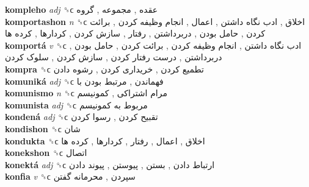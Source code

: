\textbf{kompleho} \emph{adj}  ␝ϲ   عقده ,  مجموعه ,  گروه   \\
\textbf{komportashon} \emph{n}  ␝ϲ   اخلاق ,  ادب نگاه داشتن ,  اعمال ,  انجام وظیفه کردن ,  برائت کردن ,  حامل بودن ,  دربرداشتن ,  رفتار ,  سازش کردن ,  کردارها ,  کرده ها   \\
\textbf{komportá} \emph{v}  ␝ϲ   ادب نگاه داشتن ,  انجام وظیفه کردن ,  برائت کردن ,  حامل بودن ,  دربرداشتن ,  درست رفتار کردن ,  سازش کردن ,  سلوک کردن   \\
\textbf{kompra} ␝ϲ   تطمیع کردن ,  خریداری کردن ,  رشوه دادن   \\
\textbf{komuniká} \emph{adj}  ␝ϲ   فهماندن ,  مرتبط بودن با   \\
\textbf{komunismo} \emph{n}  ␝ϲ   مرام اشتراکی ,  کمونیسم   \\
\textbf{komunista} \emph{adj}  ␝ϲ   مربوط به کمونیسم   \\
\textbf{kondená} \emph{adj}  ␝ϲ   تقبیح کردن ,  رسوا کردن   \\
\textbf{kondishon} ␝ϲ   شان   \\
\textbf{kondukta} ␝ϲ   اخلاق ,  اعمال ,  رفتار ,  کردارها ,  کرده ها   \\
\textbf{konekshon} ␝ϲ   اتصال   \\
\textbf{konektá} \emph{adj}  ␝ϲ   ارتباط دادن ,  بستن ,  پیوستن ,  پیوند دادن   \\
\textbf{konfia} \emph{v}  ␝ϲ   سپردن ,  محرمانه گفتن   \\
